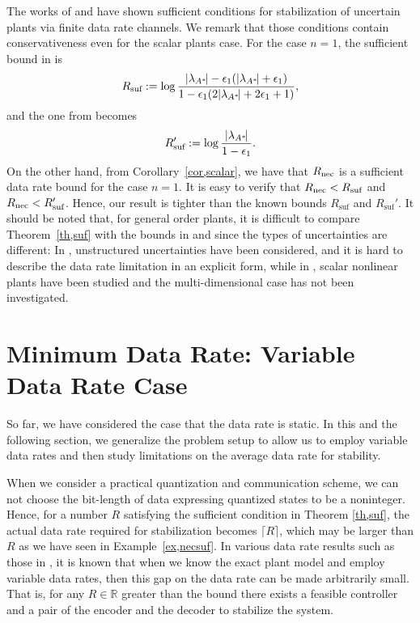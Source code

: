 \documentclass[a4paper, 11pt]{article}
\newcommand{\R}{\mathbb{R}}
\newcommand{\lambdaAS}{\lambda_{A^*}\!}
\newcommand{\Rnec}{R_{\textnormal{nec}}}
\theoremstyle{definition}
\begin{document}
The works of \cite{Phat2004} and \cite{Martins2006} have shown sufficient
conditions for stabilization of uncertain plants via finite data rate
channels.
We remark that those conditions contain conservativeness even for the
scalar plants case.
For the case $n=1$, the sufficient bound in \cite{Phat2004} is
\begin{align}
 R_{\text{suf}}:=\log\frac{|\lambdaAS|-\epsilon_1(|\lambdaAS|+\epsilon_1)}
 {1-\epsilon_1(2|\lambdaAS|+2\epsilon_1+1)},\notag \end{align}
and the one from \cite{Martins2006} becomes
\begin{align}
 R_{\text{suf}}':=\log\frac{|\lambdaAS|}{1-\epsilon_1}.\notag \end{align}
On the other hand, from Corollary~\ref{cor,scalar}, we have that $\Rnec$ is
a sufficient data rate bound for the case $n=1$.
It is easy to verify that $\Rnec<R_{\text{suf}}$ and $\Rnec<R_{\text{suf}}'$.
Hence, our result is tighter than the known bounds $R_{\text{suf}}$ and $R_{\text{suf}}'$.
It should be noted that, for general order plants, it is difficult to compare
Theorem~\ref{th,suf} with the bounds in \cite{Phat2004} and \cite{Martins2006}
since the types of uncertainties are different:
In \cite{Phat2004}, unstructured uncertainties have been considered, and it is
hard to describe the data rate limitation in an explicit form,
while in \cite{Martins2006}, scalar nonlinear plants have been studied and
the multi-dimensional case has not been investigated.


\section{Minimum Data Rate: Variable Data Rate Case}\label{sec,average}
So far, we have considered the case that the data rate is static.
In this and the following section, we generalize the problem setup to allow
us to employ variable data rates and then study limitations on the average
data rate for stability.

When we consider a practical quantization and communication scheme, we
can not choose the bit-length of data expressing quantized states to be
a noninteger.
Hence, for a number $R$ satisfying the sufficient condition in Theorem
\ref{th,suf}, the actual data rate required for stabilization becomes $\lceil R\rceil$,
which may be larger than $R$ as we have seen in Example~\ref{ex,necsuf}.
In various data rate results such as those in \cite{Tatikonda2004, Nair2004, You2010},
it is known that when we know the exact plant model and employ variable
data rates, then this gap on the data rate can be made arbitrarily small.
That is, for any $R\in\R$ greater than the bound there exists a feasible controller and a pair of the encoder and the decoder
to stabilize the system.
\end{document}
